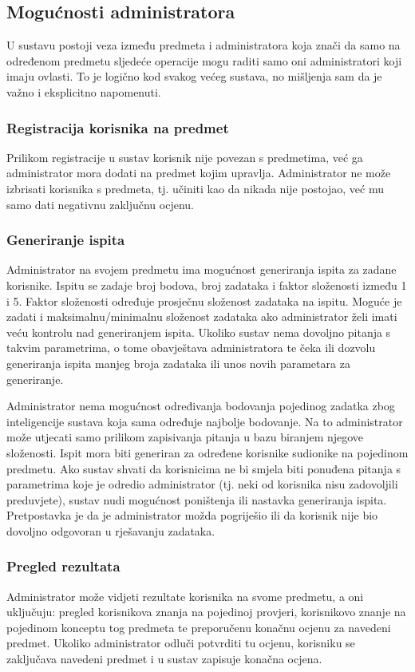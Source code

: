 \documentclass[times, utf8, zavrsni, numeric]{fer}
\begin{document}
\subsection{Mogućnosti administratora}
U sustavu postoji veza između predmeta i administratora koja znači da samo na određenom predmetu sljedeće operacije mogu raditi samo oni administratori koji imaju ovlasti. To je logično kod svakog većeg sustava, no mišljenja sam da je važno i eksplicitno napomenuti.

\subsubsection{Registracija korisnika na predmet}
Prilikom registracije u sustav korisnik nije povezan s predmetima, već ga administrator mora dodati na predmet kojim upravlja. Administrator ne može izbrisati korisnika s predmeta, tj. učiniti kao da nikada nije postojao, već mu samo dati negativnu zaključnu ocjenu.

\subsubsection{Generiranje ispita}
Administrator na svojem predmetu ima mogućnost generiranja ispita za zadane korisnike. Ispitu se zadaje broj bodova, broj zadataka i faktor složenosti između 1 i 5. Faktor složenosti određuje prosječnu složenost zadataka na ispitu. Moguće je zadati i maksimalnu/minimalnu složenost zadataka ako administrator želi imati veću kontrolu nad generiranjem ispita.
Ukoliko sustav nema dovoljno pitanja s takvim parametrima, o tome obavještava administratora te čeka ili dozvolu generiranja ispita manjeg broja zadataka ili unos novih parametara za generiranje.
\par
Administrator nema mogućnost određivanja bodovanja pojedinog zadatka zbog inteligencije sustava koja sama određuje najbolje bodovanje. Na to administrator može utjecati samo prilikom zapisivanja pitanja u bazu biranjem njegove složenosti.
Ispit mora biti generiran za određene korisnike sudionike na pojedinom predmetu. Ako sustav shvati da korisnicima ne bi smjela biti ponuđena pitanja s parametrima koje je odredio administrator (tj. neki od korisnika nisu zadovoljili preduvjete), sustav nudi mogućnost poništenja ili nastavka generiranja ispita. Pretpostavka je da je administrator možda pogriješio ili da korisnik nije bio dovoljno odgovoran u rješavanju zadataka.

\subsubsection{Pregled rezultata}
Administrator može vidjeti rezultate korisnika na svome predmetu, a oni uključuju: pregled korisnikova znanja na pojedinoj provjeri, korisnikovo znanje na pojedinom konceptu tog predmeta te preporučenu konačnu ocjenu za navedeni predmet.
Ukoliko administrator odluči potvrditi tu ocjenu, korisniku se zaključava navedeni predmet i u sustav zapisuje konačna ocjena.
\end{document}

